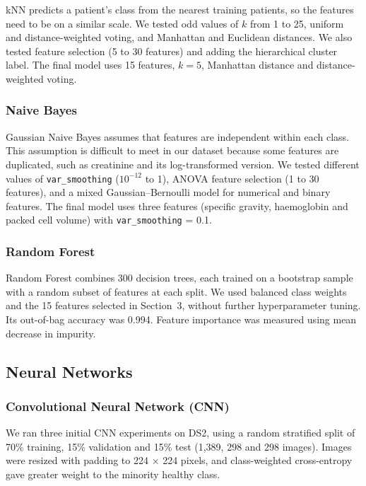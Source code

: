 kNN\cite{cover1967} predicts a patient's class from the nearest training patients, so the features need to be on a similar scale. We tested odd values of $k$ from 1 to 25, uniform and distance-weighted voting, and Manhattan and Euclidean distances. We also tested  feature selection (5 to 30 features) and adding the hierarchical cluster label. The final model uses 15 features, $k=5$, Manhattan distance and distance-weighted voting.

\subsubsection{Naive Bayes}\label{sec:nb}

Gaussian Naive Bayes assumes that features are independent within each class. This assumption is difficult to meet in our dataset because some features are duplicated, such as creatinine and its log-transformed version. We tested different values of \texttt{var\_smoothing} ($10^{-12}$ to 1), ANOVA feature selection (1 to 30 features), and a mixed Gaussian--Bernoulli model for numerical and binary features. The final model uses three features (specific gravity, haemoglobin and packed cell volume) with \texttt{var\_smoothing} = 0.1.

\subsubsection{Random Forest}\label{sec:rf}

Random Forest\cite{breiman2001} combines 300 decision trees, each trained on a bootstrap sample with a random subset of features at each split. We used balanced class weights and the 15 features selected in Section~3, without further hyperparameter tuning. Its out-of-bag accuracy was 0.994. Feature importance was measured using mean decrease in impurity.

\subsection{Neural Networks}

\subsubsection{Convolutional Neural Network (CNN)}\label{sec:cnn}

We ran three initial CNN experiments on DS2, using a random stratified split of 70\% training, 15\% validation and 15\% test (1,389, 298 and 298 images). Images were resized with padding to 224 $\times$ 224 pixels, and class-weighted cross-entropy gave greater weight to the minority healthy class.

